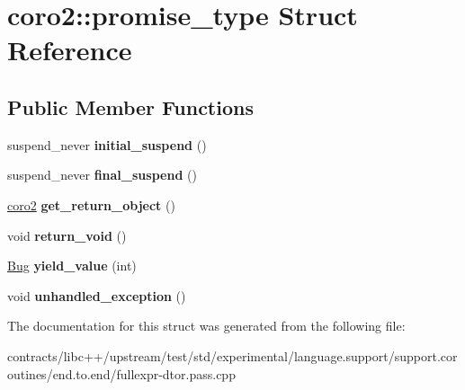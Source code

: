\hypertarget{structcoro2_1_1promise__type}{}\section{coro2\+:\+:promise\+\_\+type Struct Reference}
\label{structcoro2_1_1promise__type}
\subsection*{Public Member Functions}
\begin{DoxyCompactItemize}
\item 
\mbox{\label{structcoro2_1_1promise__type_a597203a5c23beb602b3f65efec30944e}} 
suspend\+\_\+never {\bfseries initial\+\_\+suspend} ()
\item 
\mbox{\label{structcoro2_1_1promise__type_a8ca0ded15cb5cacaa73ea36c37841a36}} 
suspend\+\_\+never {\bfseries final\+\_\+suspend} ()
\item 
\mbox{\label{structcoro2_1_1promise__type_ae75a5ecaf2c8dca26ade7bd0a3e63517}} 
\mbox{\hyperlink{structcoro2}{coro2}} {\bfseries get\+\_\+return\+\_\+object} ()
\item 
\mbox{\label{structcoro2_1_1promise__type_af697ef3b9c922bc92f3823622d735788}} 
void {\bfseries return\+\_\+void} ()
\item 
\mbox{\label{structcoro2_1_1promise__type_a324615ce0cb066fd746b60757f6439a7}} 
\mbox{\hyperlink{struct_bug}{Bug}} {\bfseries yield\+\_\+value} (int)
\item 
\mbox{\label{structcoro2_1_1promise__type_a526121619f2889586e2906d1cf89325f}} 
void {\bfseries unhandled\+\_\+exception} ()
\end{DoxyCompactItemize}


The documentation for this struct was generated from the following file\+:\begin{DoxyCompactItemize}
\item 
contracts/libc++/upstream/test/std/experimental/language.\+support/support.\+coroutines/end.\+to.\+end/fullexpr-\/dtor.\+pass.\+cpp\end{DoxyCompactItemize}
